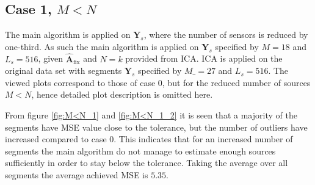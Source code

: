 \subsection{Case 1, $M < N$}
The main algorithm is applied on $\mathbf{Y}_s$, where the number of sensors is reduced by one-third. 
As such the main algorithm is applied on $\mathbf{Y}_s$ specified by $M = 18$ and $L_s = 516$, given $\hat{\mathbf{A}}_{\text{fix}}$ and $N = k$ provided from ICA. 
ICA is applied on the original data set with segments $\mathbf{Y}_s$ specified by $M\_ = 27$ and $L_s = 516$.  
The viewed plots correspond to those of case 0, but for the reduced number of sources $M < N$, hence detailed plot description is omitted here.   

From figure \ref{fig:M<N_1} and \ref{fig:M<N_1_2} it is seen that a majority of the segments have MSE value close to the tolerance, but the number of outliers have increased compared to case 0.
This indicates that for an increased number of segments the main algorithm do not manage to estimate enough sources sufficiently in order to stay below the tolerance. Taking the average over all segments the average achieved MSE is $5.35$.
